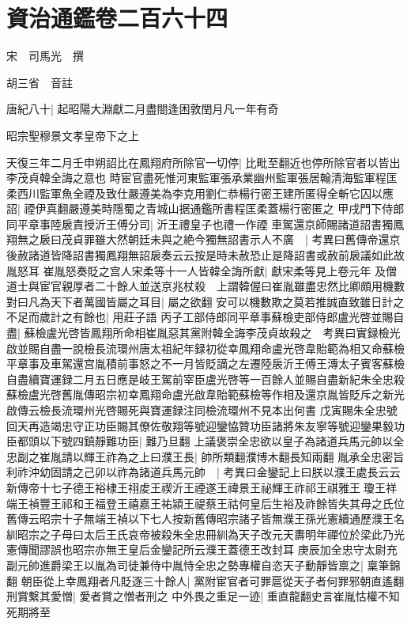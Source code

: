 \section{資治通鑑卷二百六十四}
宋　司馬光　撰

胡三省　音註

唐紀八十|{
	起昭陽大淵獻二月盡閤逢困敦閏月凡一年有奇}


昭宗聖穆景文孝皇帝下之上

天復三年二月壬申朔詔比在鳳翔府所除官一切停|{
	比毗至翻近也停所除官者以皆出李茂貞韓全誨之意也}
時宦官盡死惟河東監軍張承業幽州監軍張居翰清海監軍程匡柔西川監軍魚全禋及致仕嚴遵美為李克用劉仁恭楊行密王建所匿得全斬它囚以應詔|{
	禋伊真翻嚴遵美時隱蜀之青城山据通鑑所書程匡柔蓋楊行密匿之}
甲戌門下侍郎同平章事陸扆責授沂王傅分司|{
	沂王禮皇子也禮一作禋}
車駕還京師賜諸道詔書獨鳳翔無之扆曰茂貞罪雖大然朝廷未與之絶今獨無詔書示人不廣　|{
	考異曰舊傳帝還京後赦諸道皆降詔書獨鳳翔無詔扆奏云云按是時未赦恐止是降詔書或赦前扆議如此故胤怒耳}
崔胤怒奏貶之宫人宋柔等十一人皆韓全誨所獻|{
	獻宋柔等見上卷元年}
及僧道士與宦官親厚者二十餘人並送京兆杖殺　上謂韓偓曰崔胤雖盡忠然比卿頗用機數對曰凡為天下者萬國皆屬之耳目|{
	屬之欲翻}
安可以機數欺之莫若推誠直致雖日計之不足而歲計之有餘也|{
	用莊子語}
丙子工部侍郎同平章事蘇檢吏部侍郎盧光啓並賜自盡|{
	蘇檢盧光啓皆鳳翔所命相崔胤惡其黨附韓全誨李茂貞故殺之　考異曰實録檢光啟並賜自盡一說檢長流環州唐太祖紀年録初從幸鳳翔命盧光啓韋貽範為相又命蘇檢平章事及車駕還宫胤積前事怒之不一月皆貶謫之左遷陸扆沂王傅王漙太子賓客蘇檢自盡續寶運録二月五日應是岐王駕前宰臣盧光啓等一百餘人並賜自盡新紀朱全忠殺蘇檢盧光啓舊胤傳昭宗初幸鳳翔命盧光啟韋貽範蘇檢等作相及還京胤皆貶斥之新光啟傳云檢長流環州光啓賜死與寶運録注同檢流環州不見本出何書}
戊寅賜朱全忠號回天再造竭忠守正功臣賜其僚佐敬翔等號迎鑾恊贊功臣諸將朱友寧等號迎鑾果毅功臣都頭以下號四鎮靜難功臣|{
	難乃旦翻}
上議褒崇全忠欲以皇子為諸道兵馬元帥以全忠副之崔胤請以輝王祚為之上曰濮王長|{
	帥所類翻濮博木翻長知兩翻}
胤承全忠密旨利祚沖幼固請之己卯以祚為諸道兵馬元帥　|{
	考異曰金鑾記上曰朕以濮王處長云云新傳帝十七子德王裕棣王祤䖍王禊沂王禋遂王禕景王祕輝王祚祁王祺雅王瓊王祥端王禎豐王祁和王福登王禧嘉王祐潁王禔蔡王祜何皇后生裕及祚餘皆失其母之氏位舊傳云昭宗十子無端王禎以下七人按新舊傳昭宗諸子皆無濮王孫光憲續通歷濮王名紃昭宗之子母曰太后王氏哀帝被殺朱全忠冊紃為天子改元天夀明年禪位於梁此乃光憲傳聞謬誤也昭宗亦無王皇后金鑾記所云濮王蓋德王改封耳}
庚辰加全忠守太尉充副元帥進爵梁王以胤為司徒兼侍中胤恃全忠之勢專權自恣天子動靜皆禀之|{
	稟筆錦翻}
朝臣從上幸鳳翔者凡貶逐三十餘人|{
	黨附宦官者可罪扈從天子者何罪邪朝直遙翻}
刑賞繫其愛憎|{
	愛者賞之憎者刑之}
中外畏之重足一迹|{
	重直龍翻史言崔胤怙權不知死期將至}
